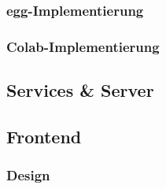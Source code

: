 \subsubsection{egg-Implementierung}\label{subsub:egg}

\subsubsection{Colab-Implementierung}\label{subsub:colab}

\subsection{Services \& Server}

\subsection{Frontend}

\subsubsection{Design}
